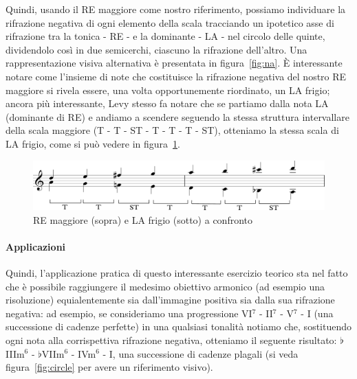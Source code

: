 \documentclass[12pt]{article}
\begin{document}
Quindi, usando il RE maggiore come nostro riferimento, possiamo individuare la rifrazione negativa di ogni elemento della scala tracciando un ipotetico asse di rifrazione tra la tonica  - RE - e la dominante - LA - nel circolo delle quinte, dividendolo così in due semicerchi, ciascuno la rifrazione dell'altro. Una rappresentazione visiva alternativa è presentata in figura~\ref{fig:na}. È interessante notare come l'insieme di note che costituisce la rifrazione negativa del nostro RE maggiore si rivela essere, una volta opportunemente riordinato, un LA frigio; ancora più interessante, Levy stesso fa notare che se partiamo dalla nota LA (dominante di RE) e andiamo a scendere seguendo la stessa struttura intervallare della scala maggiore (T - T - ST - T - T - T - ST), otteniamo la stessa scala di LA frigio, come si può vedere in figura~\ref{fig:m-ph}.

\begin{figure}[H]
 \centering
 \includegraphics[width=\textwidth,keepaspectratio]{aa/major-phrygian}
 \caption{RE maggiore (sopra) e LA frigio (sotto) a confronto}
 \label{fig:m-ph}
\end{figure}

\paragraph{Applicazioni}

Quindi, l'applicazione pratica di questo interessante esercizio teorico sta nel fatto che è possibile raggiungere il medesimo obiettivo armonico (ad esempio una risoluzione) equialentemente sia dall'immagine positiva sia dalla sua rifrazione negativa: ad esempio, se consideriamo una progressione VI\(^{7}\) - II\(^{7}\) - V\(^{7}\) - I (una successione di cadenze perfette) in una qualsiasi tonalità notiamo che, sostituendo ogni nota alla corrispettiva rifrazione negativa, otteniamo il seguente risultato: \(\flat\)IIIm\(^{6}\) - \(\flat\)VIIm\(^{6}\) - IVm\(^{6}\) - I, una successione di cadenze plagali (si veda figura~\ref{fig:circle} per avere un riferimento visivo).
\end{document}
